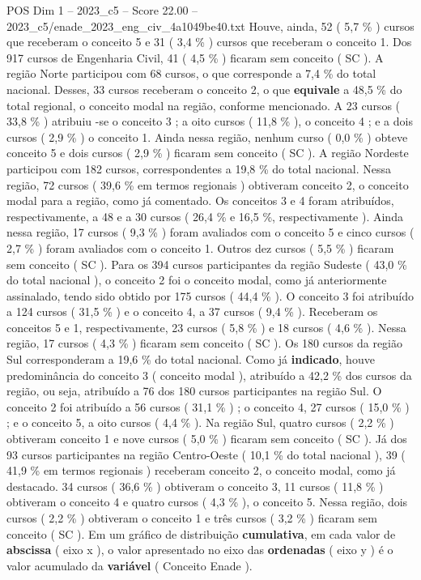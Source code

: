 \begin{textsample}{POS Dim 1 – 2023\_c5 – Score 22.00 – 2023\_c5/enade\_2023\_eng\_civ\_4a1049be40.txt}
Houve, ainda, 52 ( 5,7 \% ) cursos que receberam o conceito 5 e 31 ( 3,4 \% ) cursos que receberam o conceito 1.
Dos 917 cursos de Engenharia Civil, 41 ( 4,5 \% ) ficaram sem conceito ( SC ).
A região Norte participou com 68 cursos, o que corresponde a 7,4 \% do total nacional.
Desses, 33 cursos receberam o conceito 2, o que \textbf{equivale} a 48,5 \% do total regional, o conceito modal na região, conforme mencionado.
A 23 cursos ( 33,8 \% ) atribuiu -se o conceito 3 ; a oito cursos ( 11,8 \% ), o conceito 4 ; e a dois cursos ( 2,9 \% ) o conceito 1.
Ainda nessa região, nenhum curso ( 0,0 \% ) obteve conceito 5 e dois cursos ( 2,9 \% ) ficaram sem conceito ( SC ).
A região Nordeste participou com 182 cursos, correspondentes a 19,8 \% do total nacional.
Nessa região, 72 cursos ( 39,6 \% em termos regionais ) obtiveram conceito 2, o conceito modal para a região, como já comentado.
Os conceitos 3 e 4 foram atribuídos, respectivamente, a 48 e a 30 cursos ( 26,4 \% e 16,5 \%, respectivamente ).
Ainda nessa região, 17 cursos ( 9,3 \% ) foram avaliados com o conceito 5 e cinco cursos ( 2,7 \% ) foram avaliados com o conceito 1.
Outros dez cursos ( 5,5 \% ) ficaram sem conceito ( SC ).
Para os 394 cursos participantes da região Sudeste ( 43,0 \% do total nacional ), o conceito 2 foi o conceito modal, como já anteriormente assinalado, tendo sido obtido por 175 cursos ( 44,4 \% ).
O conceito 3 foi atribuído a 124 cursos ( 31,5 \% ) e o conceito 4, a 37 cursos ( 9,4 \% ).
Receberam os conceitos 5 e 1, respectivamente, 23 cursos ( 5,8 \% ) e 18 cursos ( 4,6 \% ).
Nessa região, 17 cursos ( 4,3 \% ) ficaram sem conceito ( SC ).
Os 180 cursos da região Sul corresponderam a 19,6 \% do total nacional.
Como já \textbf{indicado}, houve predominância do conceito 3 ( conceito modal ), atribuído a 42,2 \% dos cursos da região, ou seja, atribuído a 76 dos 180 cursos participantes na região Sul.
O conceito 2 foi atribuído a 56 cursos ( 31,1 \% ) ; o conceito 4, 27 cursos ( 15,0 \% ) ; e o conceito 5, a oito cursos ( 4,4 \% ).
Na região Sul, quatro cursos ( 2,2 \% ) obtiveram conceito 1 e nove cursos ( 5,0 \% ) ficaram sem conceito ( SC ).
Já dos 93 cursos participantes na região Centro-Oeste ( 10,1 \% do total nacional ), 39 ( 41,9 \% em termos regionais ) receberam conceito 2, o conceito modal, como já destacado. 34 cursos ( 36,6 \% ) obtiveram o conceito 3, 11 cursos ( 11,8 \% ) obtiveram o conceito 4 e quatro cursos ( 4,3 \% ), o conceito 5.
Nessa região, dois cursos ( 2,2 \% ) obtiveram o conceito 1 e três cursos ( 3,2 \% ) ficaram sem conceito ( SC ).
Em um gráfico de distribuição \textbf{cumulativa}, em cada valor de \textbf{abscissa} ( eixo x ), o valor apresentado no eixo das \textbf{ordenadas} ( eixo y ) é o valor acumulado da \textbf{variável} ( Conceito Enade ).

\end{textsample}
